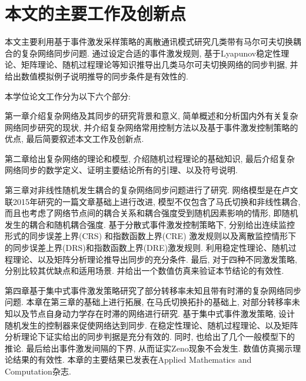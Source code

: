 %


\section{本文的主要工作及创新点}

本文主要利用基于事件激发采样策略的离散通讯模式研究几类带有马尔可夫切换耦合的复杂网络同步问题. 通过设定合适的事件激发规则, 基于Lyapunov稳定性理论、矩阵理论、随机过程理论等知识推导出几类马尔可夫切换网络的同步判据, 并给出数值模拟例子说明推导的同步条件是有效性的.

本学位论文工作分为以下六个部分:

第一章介绍复杂网络及其同步的研究背景和意义, 简单概述和分析国内外有关复杂网络同步研究的现状, 并介绍复杂网络常用控制方法以及基于事件激发控制策略的优点, 最后简要叙述本文工作及创新点.

第二章给出复杂网络的理论和模型, 介绍随机过程理论的基础知识, 最后介绍复杂网络同步的数学定义、证明主要结论所有的引理、以及符号说明.

第三章对非线性随机发生耦合的复杂网络同步问题进行了研究. 网络模型是在卢文联2015年研究的一篇文章基础上进行改进, 模型不仅包含了马氏切换和非线性耦合, 而且也考虑了网络节点间的耦合关系和耦合强度受到随机因素影响的情形, 即随机发生的耦合和随机耦合强度. 基于分散式事件激发控制策略下, 分别给出连续监控形式的同步误差上界(CRS) 和指数函数上界(CRE) 激发规则以及离散监控情形下的同步误差上界(DRS)和指数函数上界(DRE)激发规则. 利用稳定性理论、随机过程理论、以及矩阵分析理论推导出同步的充分条件. 最后, 对于四种不同激发策略, 分别比较其优缺点和适用场景. 并给出一个数值仿真来验证本节结论的有效性.

第四章基于集中式事件激发策略研究了部分转移率未知且带有时滞的复杂网络同步问题. 本章在第三章的基础上进行拓展, 在马氏切换拓扑的基础上, 对部分转移率未知以及节点自身动力学存在时滞的网络进行研究. 基于集中式事件激发策略, 设计随机发生的控制器来促使网络达到同步. 在稳定性理论、随机过程理论、以及矩阵分析理论下证实给出的同步判据是充分有效的. 同时, 也给出了几个一般模型下的推论. 最后给出事件激发间隔的下界, 从而证实Zeno现象不会发生. 数值仿真揭示理论结果的有效性. 本章的主要结果已发表在Applied Mathematics and Computation杂志.

